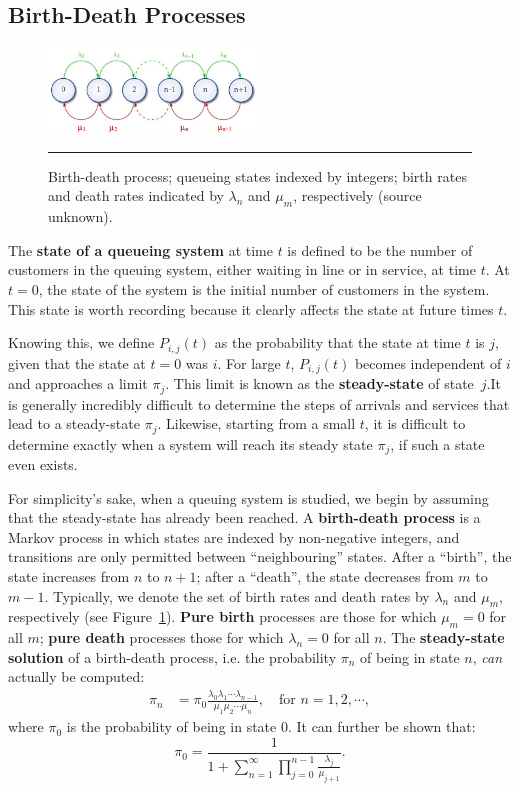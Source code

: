 \subsection{Birth-Death Processes}
\begin{figure}[!t]
	\centering
		\includegraphics[width=0.49\textwidth]{Images/fig2Queue.jpg}
	\caption[\small Birth-death process]{\small Birth-death process; queueing states indexed by integers; birth rates and death rates indicated by $\lambda_n$ and $\mu_m$, respectively (source unknown).}
	\label{fig:2}\hrule
\end{figure}
The \textbf{state of a queueing system} at time $t$ is defined to be the number of customers in the queuing system, either waiting in line or in service, at time $t$. At $t = 0$, the state of the system is  the initial number of customers in the system. This state is worth recording because it clearly affects the state at future times $t$. \par Knowing this, we define $P_{i,j} (t)$ as the probability that the state at time $t$ is $j$, given that the state at $t = 0$ was $i$. For large $t$, $P_{i,j} (t)$ becomes independent of $i$ and approaches a limit $\pi_{j}$. This limit is known as the \textbf{steady-state} of state~$j$.\newpage\noindent It is generally incredibly difficult to determine the steps of arrivals and services that lead to a steady-state $\pi_j$. Likewise, starting from a small $t$, it is difficult to determine exactly when a system will reach its steady state $\pi_j$, if such a state even exists. \par For simplicity's sake, when a queuing system is studied, we begin by assuming that the steady-state has already been reached.\newl  
A \textbf{birth-death process} is a Markov process in which states are indexed by non-negative integers, and transitions are only permitted between ``neighbouring'' states. After a ``birth'', the state increases from $n$ to $n+1$; after a ``death'', the state decreases from $m$ to $m-1$. Typically, we denote the set of birth rates and death rates by $\lambda_n$ and $\mu_m$, respectively (see Figure~\ref{fig:2}). \textbf{Pure birth} processes are those for which $\mu_m=0$ for all $m$; \textbf{pure death} processes those for which $\lambda_n=0$ for all $n$. The  \textbf{steady-state solution} of a birth-death process, i.e. the probability $\pi_n$ of being in state $n$, \textit{can} actually be computed: 
\begin{align} \pi_{n} &= \pi_{0}\frac{\lambda_{0} \lambda_{1} \cdots \lambda_{n-1}}{\mu_{1} \mu_{2} \cdots \mu_{n}},\quad  \text{for    } n=1,2,\cdots,\label{eq:ssbr}
\end{align}
where $\pi_{0}$ is  the probability of being in state 0. It can further be shown  \cite{QS_K1} that:
$$ \pi_{0} = \frac{1}{1+ \sum^{\infty}_{n=1} \prod^{n-1}_{j=0} \frac{\lambda_{j}}{\mu_{j+1}}}.$$ 

